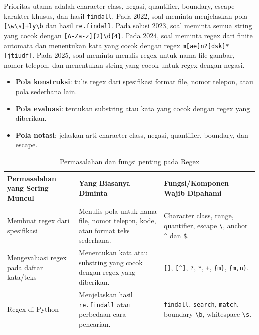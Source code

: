 Prioritas utama adalah character class, negasi, quantifier, boundary, escape karakter khusus, dan hasil \texttt{findall}. Pada 2022, soal meminta menjelaskan pola \texttt{[\textbackslash w\textbackslash s]+ly\textbackslash b} dan hasil \texttt{re.findall}. Pada solusi 2023, soal meminta semua string yang cocok dengan \texttt{[A-Za-z]\{2\}\textbackslash d\{4\}}. Pada 2024, soal meminta regex dari finite automata dan menentukan kata yang cocok dengan regex \texttt{m[ae]n?[dsk]*[jtiudf]}. Pada 2025, soal meminta menulis regex untuk nama file gambar, nomor telepon, dan menentukan string yang cocok untuk regex dengan negasi.

\begin{itemize}
    \item \textbf{Pola konstruksi}: tulis regex dari spesifikasi format file, nomor telepon, atau pola sederhana lain.
    \item \textbf{Pola evaluasi}: tentukan substring atau kata yang cocok dengan regex yang diberikan.
    \item \textbf{Pola notasi}: jelaskan arti character class, negasi, quantifier, boundary, dan escape.
\end{itemize}

\begin{table}[H]
\centering
\begin{tabularx}{\textwidth}{|L{0.30\textwidth}|X|L{0.28\textwidth}|}
\hline
\textbf{Permasalahan yang Sering Muncul} & \textbf{Yang Biasanya Diminta} & \textbf{Fungsi/Komponen Wajib Dipahami} \\
\hline
Membuat regex dari spesifikasi & Menulis pola untuk nama file, nomor telepon, kode, atau format teks sederhana. & Character class, range, quantifier, escape \texttt{\textbackslash}, anchor \texttt{\^{}} dan \texttt{\$}. \\
\hline
Mengevaluasi regex pada daftar kata/teks & Menentukan kata atau substring yang cocok dengan regex yang diberikan. & \texttt{[]}, \texttt{[\^{}]}, \texttt{?}, \texttt{*}, \texttt{+}, \texttt{\{m\}}, \texttt{\{m,n\}}. \\
\hline
Regex di Python & Menjelaskan hasil \texttt{re.findall} atau perbedaan cara pencarian. & \texttt{findall}, \texttt{search}, \texttt{match}, boundary \texttt{\textbackslash b}, whitespace \texttt{\textbackslash s}. \\
\hline
\end{tabularx}
\caption{Permasalahan dan fungsi penting pada Regex}
\label{tab:pola-fungsi-regex}
\end{table}

